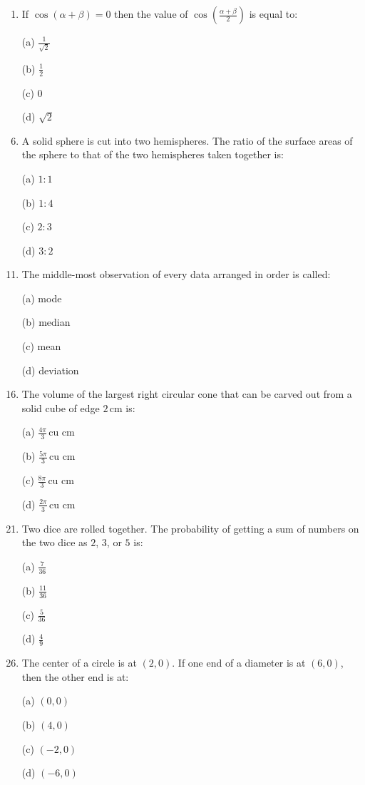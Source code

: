 \documentclass[12pt,-letter paper]{article}
\begin{document}
\begin{enumerate}
\item If $\cos(\alpha + \beta) = 0$ then the value of $\cos\left(\frac{\alpha + \beta}{2}\right)$ is equal to:
    \item[(a)] $\frac{1}{\sqrt{2}}$
    \item[(b)] $\frac{1}{2}$
    \item[(c)] $0$
    \item[(d)] $\sqrt{2}$

\item A solid sphere is cut into two hemispheres. The ratio of the surface areas of the sphere to that of the two hemispheres taken together is:
    \item[(a)] $1:1$
    \item[(b)] $1:4$
    \item[(c)] $2:3$
    \item[(d)] $3:2$

\item The middle-most observation of every data arranged in order is called:
    \item[(a)] mode
    \item[(b)] median
    \item[(c)] mean
    \item[(d)] deviation

\item The volume of the largest right circular cone that can be carved out from a solid cube of edge $2 \, \text{cm}$ is:
    \item[(a)] $\frac{4\pi}{3} \, \text{cu cm}$
    \item[(b)] $\frac{5\pi}{3} \, \text{cu cm}$
    \item[(c)] $\frac{8\pi}{3} \, \text{cu cm}$
    \item[(d)] $\frac{2\pi}{3} \, \text{cu cm}$

\item Two dice are rolled together. The probability of getting a sum of numbers on the two dice as $2$, $3$, or $5$ is:
    \item[(a)] $\frac{7}{36}$
    \item[(b)] $\frac{11}{36}$
    \item[(c)] $\frac{5}{36}$
    \item[(d)] $\frac{4}{9}$

\item The center of a circle is at $(2, 0)$. If one end of a diameter is at $(6, 0)$, then the other end is at:
    \item[(a)] $(0, 0)$
    \item[(b)] $(4, 0)$
    \item[(c)] $(-2, 0)$
    \item[(d)] $(-6, 0)$


\end{enumerate}
\end{document}
